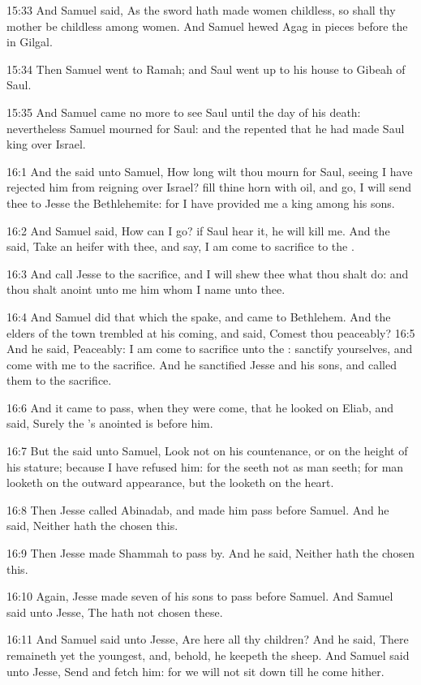 15:33 And Samuel said, As the sword hath made women childless, so
shall thy mother be childless among women. And Samuel hewed Agag in
pieces before the \LORD in Gilgal.

15:34 Then Samuel went to Ramah; and Saul went up to his house to
Gibeah of Saul.

15:35 And Samuel came no more to see Saul until the day of his death:
nevertheless Samuel mourned for Saul: and the \LORD repented that he
had made Saul king over Israel.

16:1 And the \LORD said unto Samuel, How long wilt thou mourn for Saul,
seeing I have rejected him from reigning over Israel? fill thine horn
with oil, and go, I will send thee to Jesse the Bethlehemite: for I
have provided me a king among his sons.

16:2 And Samuel said, How can I go? if Saul hear it, he will kill me.
And the \LORD said, Take an heifer with thee, and say, I am come to
sacrifice to the \LORD.

16:3 And call Jesse to the sacrifice, and I will shew thee what thou
shalt do: and thou shalt anoint unto me him whom I name unto thee.

16:4 And Samuel did that which the \LORD spake, and came to Bethlehem.
And the elders of the town trembled at his coming, and said, Comest
thou peaceably?  16:5 And he said, Peaceably: I am come to sacrifice
unto the \LORD: sanctify yourselves, and come with me to the sacrifice.
And he sanctified Jesse and his sons, and called them to the
sacrifice.

16:6 And it came to pass, when they were come, that he looked on
Eliab, and said, Surely the \LORD's anointed is before him.

16:7 But the \LORD said unto Samuel, Look not on his countenance, or on
the height of his stature; because I have refused him: for the \LORD
seeth not as man seeth; for man looketh on the outward appearance, but
the \LORD looketh on the heart.

16:8 Then Jesse called Abinadab, and made him pass before Samuel. And
he said, Neither hath the \LORD chosen this.

16:9 Then Jesse made Shammah to pass by. And he said, Neither hath the
\LORD chosen this.

16:10 Again, Jesse made seven of his sons to pass before Samuel. And
Samuel said unto Jesse, The \LORD hath not chosen these.

16:11 And Samuel said unto Jesse, Are here all thy children? And he
said, There remaineth yet the youngest, and, behold, he keepeth the
sheep. And Samuel said unto Jesse, Send and fetch him: for we will not
sit down till he come hither.

